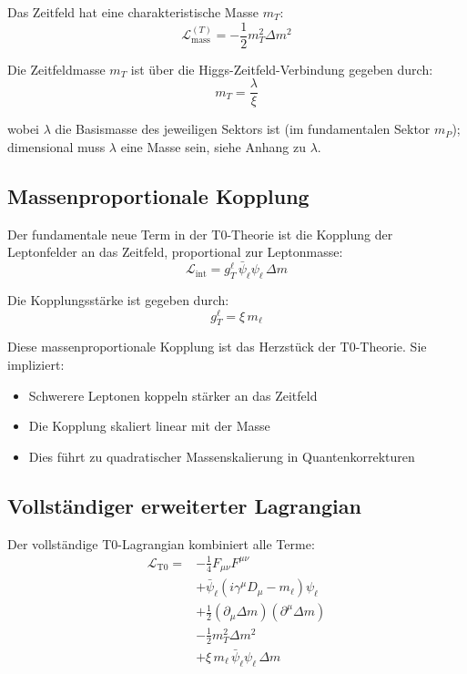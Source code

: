 	Das Zeitfeld hat eine charakteristische Masse $m_T$:
	\begin{equation}
		\mathcal{L}_{\text{mass}}^{(T)} = -\frac{1}{2} m_T^2 \Delta m^2
		\label{eq:time_field_mass}
	\end{equation}
	
	Die Zeitfeldmasse $m_T$ ist über die Higgs-Zeitfeld-Verbindung gegeben durch:
	\begin{equation}
		m_T = \frac{\lambda}{\xi}
		\label{eq:time_field_mass_value}
	\end{equation}
	
	wobei $\lambda$ die Basismasse des jeweiligen Sektors ist (im fundamentalen Sektor $m_P$); dimensional muss $\lambda$ eine Masse sein, siehe Anhang zu $\lambda$.
	
	\subsection{Massenproportionale Kopplung}
	
	Der fundamentale neue Term in der T0-Theorie ist die Kopplung der Leptonfelder an das Zeitfeld, proportional zur Leptonmasse:
	\begin{equation}
		\mathcal{L}_{\text{int}} = g_T^\ell \, \bar{\psi}_\ell \psi_\ell \, \Delta m
		\label{eq:interaction_term}
	\end{equation}
	
	Die Kopplungsstärke ist gegeben durch:
	\begin{equation}
		\boxed{g_T^\ell = \xi \, m_\ell}
		\label{eq:coupling_strength}
	\end{equation}
	
	Diese massenproportionale Kopplung ist das Herzstück der T0-Theorie. Sie impliziert:
	\begin{itemize}
		\item Schwerere Leptonen koppeln stärker an das Zeitfeld
		\item Die Kopplung skaliert linear mit der Masse
		\item Dies führt zu quadratischer Massenskalierung in Quantenkorrekturen
	\end{itemize}
	
	\subsection{Vollständiger erweiterter Lagrangian}
	
	Der vollständige T0-Lagrangian kombiniert alle Terme:
	\begin{equation}
		\begin{split}
			\mathcal{L}_{\text{T0}} = &-\frac{1}{4} F_{\mu\nu}F^{\mu\nu} \\
			&+ \bar{\psi}_\ell(i\gamma^\mu D_\mu - m_\ell)\psi_\ell \\
			&+ \frac{1}{2}(\partial_\mu \Delta m)(\partial^\mu \Delta m) \\
			&- \frac{1}{2} m_T^2 \Delta m^2 \\
			&+ \xi \, m_\ell \,\bar{\psi}_\ell \psi_\ell \, \Delta m
		\end{split}
		\label{eq:full_lagrangian}
	\end{equation}
	
